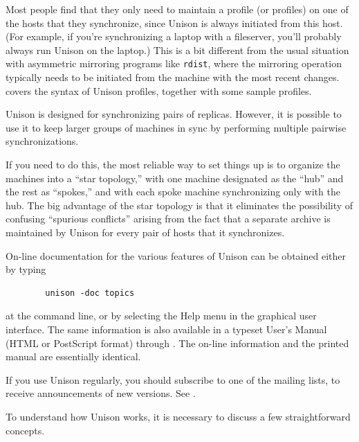 \documentclass{article}
\begin{document}
Most people find that they only need to maintain a profile (or
profiles) on one of the hosts that they synchronize, since Unison is
always initiated from this host.  (For example, if you're
synchronizing a laptop with a fileserver, you'll probably always run
Unison on the laptop.)  This is a bit different from the usual
situation with asymmetric mirroring programs like \verb|rdist|, where
the mirroring operation typically needs to be initiated from the
machine with the most recent changes.  
covers the syntax of Unison profiles, together with some sample profiles.


Unison is designed for synchronizing pairs of replicas.  However, it is
possible to use it to keep larger groups of machines in sync by performing
multiple pairwise synchronizations.

If you need to do this, the most reliable way to set things up is to
organize the machines into a ``star topology,'' with one machine designated
as the ``hub'' and the rest as ``spokes,'' and with each spoke machine
synchronizing only with the hub.  The big advantage of the star topology is
that it eliminates the possibility of confusing ``spurious conflicts''
arising from the fact that a separate archive is maintained by Unison for
every pair of hosts that it synchronizes.



On-line documentation for the various features of Unison
can be obtained either by typing
\begin{verbatim}
        unison -doc topics
\end{verbatim}
\noindent
at the command line, or by selecting the Help menu in the graphical
user interface.
\iftextversion
The same information is also available in a typeset User's
Manual (HTML or PostScript format) through
.
\else
The on-line information and the printed manual are essentially identical.
\fi

If you use Unison regularly, you should subscribe to one of the mailing
lists, to receive announcements of new versions.  See
.


To understand how Unison works, it is necessary to discuss a few
straightforward concepts.
\end{document}

